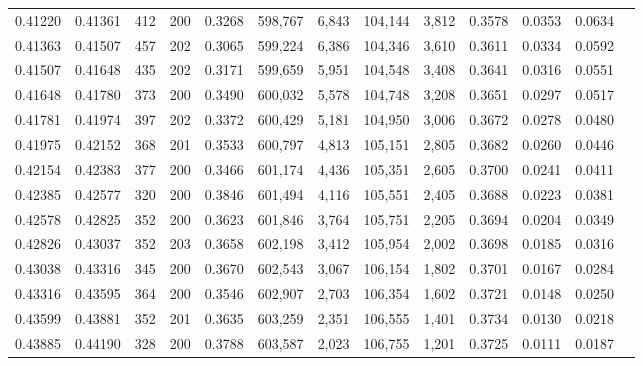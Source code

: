 \begin{tabular}{rrrrrrrrrrrrr}
0.41220 & 0.41361 &   412 & 200 &                                     0.3268 & 598,767 &   6,843 & 104,144 &   3,812 & 0.3578 & 0.0353 & 0.0634 \\
0.41363 & 0.41507 &   457 & 202 &                                     0.3065 & 599,224 &   6,386 & 104,346 &   3,610 & 0.3611 & 0.0334 & 0.0592 \\
0.41507 & 0.41648 &   435 & 202 &                                     0.3171 & 599,659 &   5,951 & 104,548 &   3,408 & 0.3641 & 0.0316 & 0.0551 \\
0.41648 & 0.41780 &   373 & 200 &                                     0.3490 & 600,032 &   5,578 & 104,748 &   3,208 & 0.3651 & 0.0297 & 0.0517 \\
0.41781 & 0.41974 &   397 & 202 &                                     0.3372 & 600,429 &   5,181 & 104,950 &   3,006 & 0.3672 & 0.0278 & 0.0480 \\
0.41975 & 0.42152 &   368 & 201 &                                     0.3533 & 600,797 &   4,813 & 105,151 &   2,805 & 0.3682 & 0.0260 & 0.0446 \\
0.42154 & 0.42383 &   377 & 200 &                                     0.3466 & 601,174 &   4,436 & 105,351 &   2,605 & 0.3700 & 0.0241 & 0.0411 \\
0.42385 & 0.42577 &   320 & 200 &                                     0.3846 & 601,494 &   4,116 & 105,551 &   2,405 & 0.3688 & 0.0223 & 0.0381 \\
0.42578 & 0.42825 &   352 & 200 &                                     0.3623 & 601,846 &   3,764 & 105,751 &   2,205 & 0.3694 & 0.0204 & 0.0349 \\
0.42826 & 0.43037 &   352 & 203 &                                     0.3658 & 602,198 &   3,412 & 105,954 &   2,002 & 0.3698 & 0.0185 & 0.0316 \\
0.43038 & 0.43316 &   345 & 200 &                                     0.3670 & 602,543 &   3,067 & 106,154 &   1,802 & 0.3701 & 0.0167 & 0.0284 \\
0.43316 & 0.43595 &   364 & 200 &                                     0.3546 & 602,907 &   2,703 & 106,354 &   1,602 & 0.3721 & 0.0148 & 0.0250 \\
0.43599 & 0.43881 &   352 & 201 &                                     0.3635 & 603,259 &   2,351 & 106,555 &   1,401 & 0.3734 & 0.0130 & 0.0218 \\
0.43885 & 0.44190 &   328 & 200 &                                     0.3788 & 603,587 &   2,023 & 106,755 &   1,201 & 0.3725 & 0.0111 & 0.0187 \\

\end{tabular}
